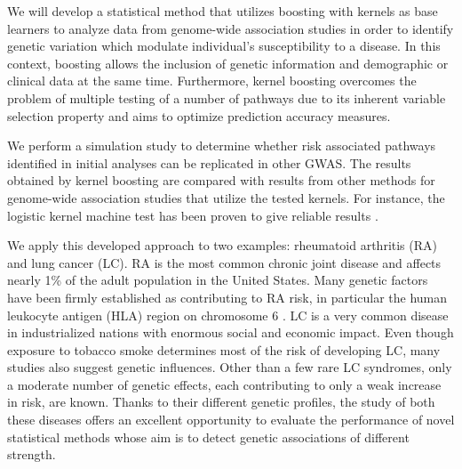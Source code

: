 \documentclass[a4paper,10pt]{article}
\newcommand{\jm}[1]{{\color{blue} #1}}
\begin{document}
We will develop a statistical method that utilizes boosting with kernels as base learners to analyze data from genome-wide association studies in order to identify genetic variation which modulate individual's susceptibility to a disease. 
In this context, boosting allows the inclusion of genetic information and demographic or clinical data at the same time. Furthermore, kernel boosting overcomes the problem of multiple testing of a number of pathways due to its inherent variable selection property \citep{hofner2011} and aims to optimize prediction accuracy measures.

We perform a simulation study to determine whether risk associated pathways identified in initial analyses can be replicated in other GWAS.
The results obtained by kernel boosting are compared with results from other methods for genome-wide association studies that utilize the tested kernels.
For instance, the logistic kernel machine test has been proven to give reliable results \citep{freytag2012,freytag2013}.

We apply this developed approach to two examples: rheumatoid arthritis (RA) and lung cancer (LC). 
RA is the most common chronic joint disease and affects nearly 1\% of the adult population in the United States. Many genetic factors have been firmly established as contributing to RA risk, in particular the human leukocyte antigen (HLA) region on chromosome 6 \citep{raychaudhuri2010}. 
LC is a very common disease in industrialized nations with enormous social and economic impact. Even though exposure to tobacco smoke determines most of the risk of developing LC, many studies also suggest genetic influences. Other than a few rare LC syndromes, only a moderate number of genetic effects, each contributing to only a weak increase in risk, are known.
Thanks to their different genetic profiles, the study of both these diseases offers an excellent opportunity to evaluate the performance of novel statistical methods whose aim is to detect genetic associations of different strength.
\\
\end{document}

